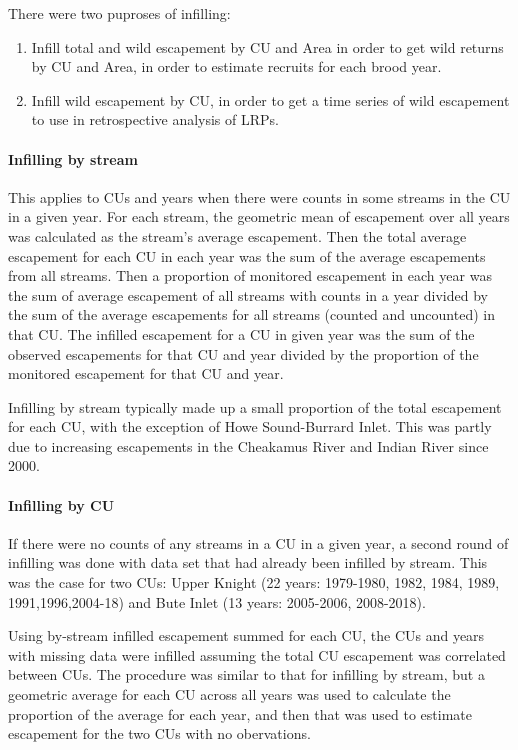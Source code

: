 \documentclass[11pt]{book}
\begin{document}
There were two puproses of infilling:
\begin{enumerate}
\def\labelenumi{\arabic{enumi}.}
\item
  Infill total and wild escapement by CU and Area in order to get wild returns by CU and Area, in order to estimate recruits for each brood year.
\item
  Infill wild escapement by CU, in order to get a time series of wild escapement to use in retrospective analysis of LRPs.
\end{enumerate}
\hypertarget{infilling-by-stream}{%
\paragraph{Infilling by stream}\label{infilling-by-stream}}

This applies to CUs and years when there were counts in some streams in the CU in a given year. For each stream, the geometric mean of escapement over all years was calculated as the stream's average escapement. Then the total average escapement for each CU in each year was the sum of the average escapements from all streams. Then a proportion of monitored escapement in each year was the sum of average escapement of all streams with counts in a year divided by the sum of the average escapements for all streams (counted and uncounted) in that CU. The infilled escapement for a CU in given year was the sum of the observed escapements for that CU and year divided by the proportion of the monitored escapement for that CU and year.

Infilling by stream typically made up a small proportion of the total escapement for each CU, with the exception of Howe Sound-Burrard Inlet. This was partly due to increasing escapements in the Cheakamus River and Indian River since 2000.

\hypertarget{infilling-by-cu}{%
\paragraph{Infilling by CU}\label{infilling-by-cu}}

If there were no counts of any streams in a CU in a given year, a second round of infilling was done with data set that had already been infilled by stream. This was the case for two CUs: Upper Knight (22 years: 1979-1980, 1982, 1984, 1989, 1991,1996,2004-18) and Bute Inlet (13 years: 2005-2006, 2008-2018).

Using by-stream infilled escapement summed for each CU, the CUs and years with missing data were infilled assuming the total CU escapement was correlated between CUs. The procedure was similar to that for infilling by stream, but a geometric average for each CU across all years was used to calculate the proportion of the average for each year, and then that was used to estimate escapement for the two CUs with no obervations.
\end{document}
